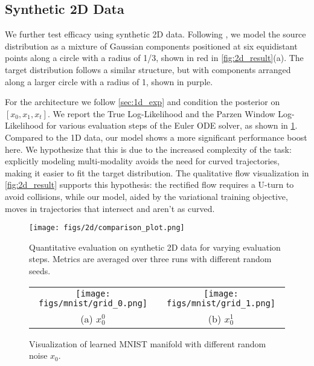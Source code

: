 \subsection{Synthetic 2D Data}
\label{sec:2d_exp}

We further test  efficacy using  synthetic 2D data. Following \citet{liu2023flow}, we model the source distribution as a mixture of Gaussian components positioned at six equidistant points along a circle with a radius of 1/3, shown in red in \cref{fig:2d_result}(a). The target distribution follows a similar structure, but with components arranged along a larger circle with a radius of 1, shown in purple. %

For the architecture we follow \cref{sec:1d_exp} and condition the posterior on \([x_0, x_1, x_t]\). We report the True Log-Likelihood and the Parzen Window Log-Likelihood for various evaluation steps of the Euler ODE solver, as shown in \cref{fig:2d_quant_result}. Compared to the 1D data, our model shows a more significant performance boost here. 
We hypothesize that this  is due to the increased complexity of the task: explicitly modeling multi-modality avoids the need for curved trajectories, making it easier to fit the target distribution. The qualitative flow visualization in \cref{fig:2d_result} supports this hypothesis: the rectified flow  requires a U-turn to avoid collisions, while our model, aided by the variational training objective, moves   in trajectories that intersect and aren't as curved.




\begin{figure}[t]
    \vspace{-2mm}
    \centering
    \texttt{[image: figs/2d/comparison\_plot.png]} %
    \vspace{-2.5em}
    \caption{Quantitative evaluation on  synthetic 2D data for varying evaluation steps. Metrics are averaged over three runs with different random seeds.}
    \label{fig:2d_quant_result}
    
    \vspace{0.5em}
\end{figure}

\begin{figure}[t]
    \vspace{-2mm}
    \centering
    \setlength{\tabcolsep}{3pt}  %
    \begin{tabular}{cc}
    \texttt{[image: figs/mnist/grid\_0.png]} &
    \texttt{[image: figs/mnist/grid\_1.png]} \\
    (a) $x^0_0$ & (b) $x^1_0$ \\
    \end{tabular}
    \vspace{-2mm}
    \caption{Visualization of learned MNIST manifold with different random noise $x_0$. %
    }
    \label{fig:MNIST_manifold}
    \vspace{0.5em}
\end{figure}












